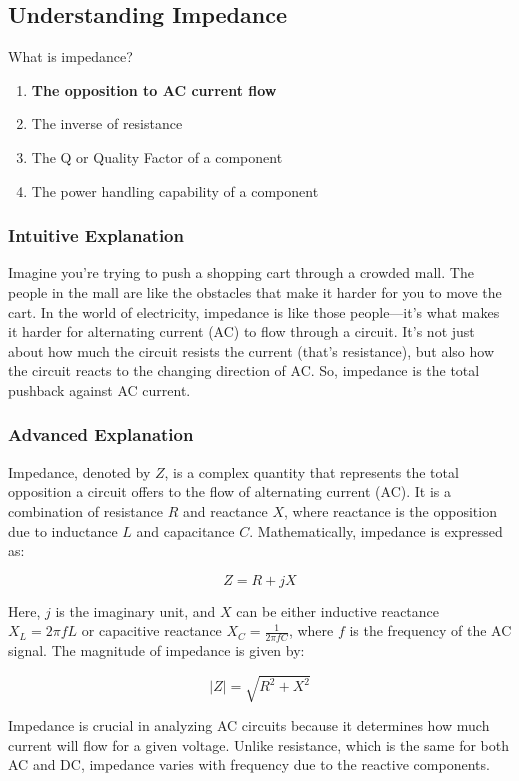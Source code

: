 \subsection{Understanding Impedance}
\label{T5C12}

\begin{tcolorbox}[colback=gray!10!white,colframe=black!75!black,title=T5C12]
What is impedance?  
\begin{enumerate}[label=\Alph*)]
    \item \textbf{The opposition to AC current flow}
    \item The inverse of resistance
    \item The Q or Quality Factor of a component
    \item The power handling capability of a component
\end{enumerate}
\end{tcolorbox}

\subsubsection{Intuitive Explanation}
Imagine you're trying to push a shopping cart through a crowded mall. The people in the mall are like the obstacles that make it harder for you to move the cart. In the world of electricity, impedance is like those people—it’s what makes it harder for alternating current (AC) to flow through a circuit. It’s not just about how much the circuit resists the current (that’s resistance), but also how the circuit reacts to the changing direction of AC. So, impedance is the total pushback against AC current.

\subsubsection{Advanced Explanation}
Impedance, denoted by \( Z \), is a complex quantity that represents the total opposition a circuit offers to the flow of alternating current (AC). It is a combination of resistance \( R \) and reactance \( X \), where reactance is the opposition due to inductance \( L \) and capacitance \( C \). Mathematically, impedance is expressed as:

\[
Z = R + jX
\]

Here, \( j \) is the imaginary unit, and \( X \) can be either inductive reactance \( X_L = 2\pi fL \) or capacitive reactance \( X_C = \frac{1}{2\pi fC} \), where \( f \) is the frequency of the AC signal. The magnitude of impedance is given by:

\[
|Z| = \sqrt{R^2 + X^2}
\]

Impedance is crucial in analyzing AC circuits because it determines how much current will flow for a given voltage. Unlike resistance, which is the same for both AC and DC, impedance varies with frequency due to the reactive components.

